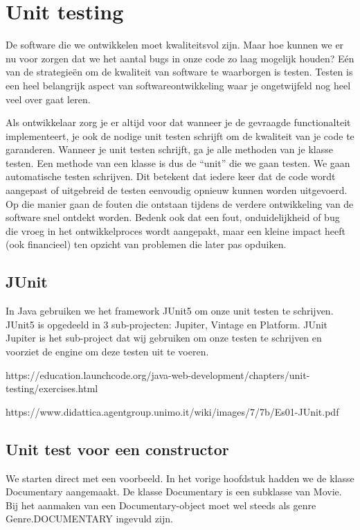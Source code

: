 \chapter{Unit testing}

\begin{summary}
De software die we ontwikkelen moet kwaliteitsvol zijn. Maar hoe kunnen we er nu voor zorgen dat we het aantal bugs in onze code zo laag mogelijk houden? E\'en van de strategie\"en om de kwaliteit van software te waarborgen is testen. Testen is een heel belangrijk aspect van softwareontwikkeling waar je ongetwijfeld nog heel veel over gaat leren. 

Als ontwikkelaar zorg je er altijd voor dat wanneer je de gevraagde functionalteit implementeert, je ook de nodige unit testen schrijft om de kwaliteit van je code te garanderen. Wanneer je unit testen schrijft, ga je alle methoden van je klasse testen. Een methode van een klasse is dus de ``unit'' die we gaan testen.
We gaan automatische testen schrijven. Dit betekent dat iedere keer dat de code wordt aangepast of uitgebreid de testen eenvoudig opnieuw kunnen worden uitgevoerd. Op die manier gaan de fouten die ontstaan tijdens de verdere ontwikkeling van de software snel ontdekt worden. Bedenk ook dat een fout, onduidelijkheid of bug die vroeg in het ontwikkelproces wordt aangepakt, maar een kleine impact heeft (ook financieel) ten opzicht van problemen die later pas opduiken.
\end{summary}

\section{JUnit}

In Java gebruiken we het framework JUnit5 om onze unit testen te schrijven.
JUnit5 is opgedeeld in 3 sub-projecten:  Jupiter, Vintage en Platform. JUnit Jupiter is het  sub-project dat wij gebruiken om onze testen te schrijven en voorziet de engine om deze testen uit te voeren.


https://education.launchcode.org/java-web-development/chapters/unit-testing/exercises.html

https://www.didattica.agentgroup.unimo.it/wiki/images/7/7b/Es01-JUnit.pdf

\section{Unit test voor een constructor}

We starten direct met een voorbeeld. In het vorige hoofdstuk hadden we de klasse Documentary aangemaakt. De klasse Documentary is een subklasse van Movie. Bij het aanmaken van een Documentary-object moet wel steeds als genre Genre.DOCUMENTARY ingevuld zijn. 

